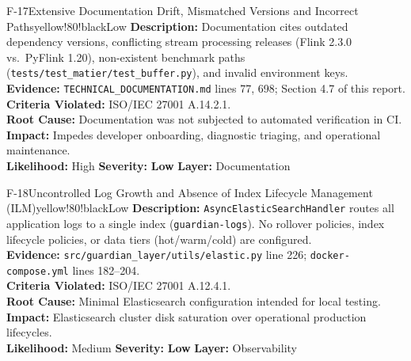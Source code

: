 \documentclass[10pt,a4paper]{report}
\begin{document}
\begin{findingbox}{F-17}{Extensive Documentation Drift, Mismatched Versions and Incorrect Paths}{yellow!80!black}{Low}
\textbf{Description:} Documentation cites outdated dependency versions, conflicting stream processing releases (Flink 2.3.0 vs.\ PyFlink 1.20), non-existent benchmark paths (\texttt{tests/test\_matier/test\_buffer.py}), and invalid environment keys.\\
\textbf{Evidence:} \texttt{TECHNICAL\_DOCUMENTATION.md} lines 77, 698; Section 4.7 of this report.\\
\textbf{Criteria Violated:} ISO/IEC 27001 A.14.2.1.\\
\textbf{Root Cause:} Documentation was not subjected to automated verification in CI.\\
\textbf{Impact:} Impedes developer onboarding, diagnostic triaging, and operational maintenance.\\
\textbf{Likelihood:} High \quad \textbar \quad \textbf{Severity:} \textbf{Low} \quad \textbar \quad \textbf{Layer:} Documentation
\end{findingbox}

\begin{findingbox}{F-18}{Uncontrolled Log Growth and Absence of Index Lifecycle Management (ILM)}{yellow!80!black}{Low}
\textbf{Description:} \texttt{AsyncElasticSearchHandler} routes all application logs to a single index (\texttt{guardian-logs}). No rollover policies, index lifecycle policies, or data tiers (hot/warm/cold) are configured.\\
\textbf{Evidence:} \texttt{src/guardian\_layer/utils/elastic.py} line 226; \texttt{docker-compose.yml} lines 182--204.\\
\textbf{Criteria Violated:} ISO/IEC 27001 A.12.4.1.\\
\textbf{Root Cause:} Minimal Elasticsearch configuration intended for local testing.\\
\textbf{Impact:} Elasticsearch cluster disk saturation over operational production lifecycles.\\
\textbf{Likelihood:} Medium \quad \textbar \quad \textbf{Severity:} \textbf{Low} \quad \textbar \quad \textbf{Layer:} Observability
\end{findingbox}
\end{document}
